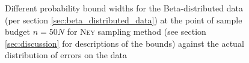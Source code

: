 \begin{figure}[]
	\caption[probability bound widths for Beta-distributed sample mean estimates]{Different probability bound widths for the Beta-distributed data (per section \ref{sec:beta_distributed_data}) at the point of sample budget $n=50N$ for \textsc{Ney} sampling method (see section \ref{sec:discussion} for descriptions of the bounds) against the actual distribution of errors on the data}
	\label{fig:bounds_widths}
\end{figure}

